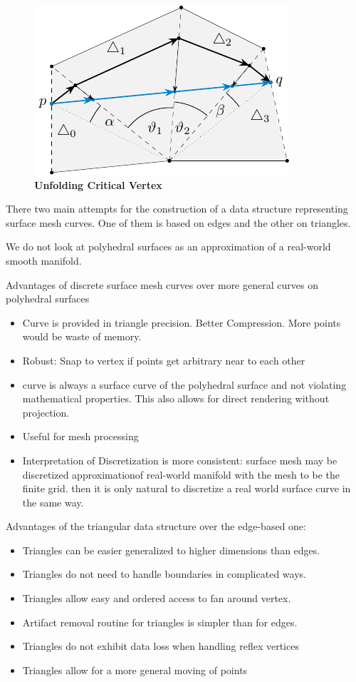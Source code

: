 \documentclass{stdlocal}
\begin{document}
  \begin{figure}
    \centering
    \includegraphics[width=0.5\linewidth]{figures/unfolding-critical-vertex.pdf}
    \caption[Unfolding Critical Vertex]{%
      \textbf{Unfolding Critical Vertex}\\
    }
  \end{figure}

  There two main attempts for the construction of a data structure representing surface mesh curves.
  One of them is based on edges and the other on triangles.

  We do not look at polyhedral surfaces as an approximation of a real-world smooth manifold.

  Advantages of discrete surface mesh curves over more general curves on polyhedral surfaces
  \begin{itemize}
    \item Curve is provided in triangle precision. Better Compression. More points would be waste of memory.
    \item Robust: Snap to vertex if points get arbitrary near to each other
    \item curve is always a surface curve of the polyhedral surface and not violating mathematical properties. This also allows for direct rendering without projection.
    \item Useful for mesh processing
    \item Interpretation of Discretization is more consistent: surface mesh may be discretized approximationof real-world manifold with the mesh to be the finite grid. then it is only natural to discretize a real world surface curve in the same way.
  \end{itemize}

  Advantages of the triangular data structure over the edge-based one:
  \begin{itemize}
    \item Triangles can be easier generalized to higher dimensions than edges.
    \item Triangles do not need to handle boundaries in complicated ways.
    \item Triangles allow easy and ordered access to fan around vertex.
    \item Artifact removal routine for triangles is simpler than for edges.
    \item Triangles do not exhibit data loss when handling reflex vertices
    \item Triangles allow for a more general moving of points
  \end{itemize}
\end{document}
